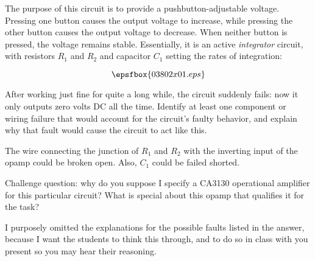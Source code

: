 

The purpose of this circuit is to provide a pushbutton-adjustable voltage.  Pressing one button causes the output voltage to increase, while pressing the other button causes the output voltage to decrease.  When neither button is pressed, the voltage remains stable.  Essentially, it is an active {\it integrator} circuit, with resistors $R_1$ and $R_2$ and capacitor $C_1$ setting the rates of integration: 

$$\epsfbox{03802x01.eps}$$

After working just fine for quite a long while, the circuit suddenly fails: now it only outputs zero volts DC all the time.  Identify at least one component or wiring failure that would account for the circuit's faulty behavior, and explain why that fault would cause the circuit to act like this.







The wire connecting the junction of $R_1$ and $R_2$ with the inverting input of the opamp could be broken open.  Also, $C_1$ could be failed shorted.

\vskip 10pt

Challenge question: why do you suppose I specify a CA3130 operational amplifier for this particular circuit?  What is special about this opamp that qualifies it for the task?







I purposely omitted the explanations for the possible faults listed in the answer, because I want the students to think this through, and to do so in class with you present so you may hear their reasoning.




